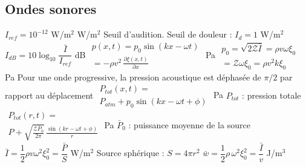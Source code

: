 \subsection{Ondes sonores}
\begin{formules}
    {$I_{ref} = 10^{-12}$ W/m$^2$}
    {W/m$^2$}
    {Seuil d'audition. Seuil de douleur : $I_d = 1$ W/m$^2$}
    {$I_{dB} = 10\log_{10}\dfrac{\bar I}{I_{ref}}$}
    {dB}
    {}
    {$\begin{gathered}
      p(x,t) = p_0\sin(kx - \omega t) \\
      = -\rho v^2\,\frac{\partial\xi(x,t)}{\partial x}
     \end{gathered}$}
    {Pa}
    {}
    {$\begin{gathered}
      p_0 = \sqrt{2\mathcal{Z}\bar I} = \rho v\omega\xi_0 \\
      = \mathcal{Z}\omega\xi_0 = \rho v^2k\xi_0
     \end{gathered}$}
    {Pa}
    {Pour une onde progressive, la pression acoustique est déphasée de $\pi/2$ par rapport au déplacement}
    {$\begin{gathered}
      P_{tot}(x,t) = \\
      P_{atm} + p_0\sin(kx - \omega t + \phi)
     \end{gathered}$}
    {Pa}
    {$P_{tot}$ : pression totale}
    {$\begin{gathered}
      P_{tot}(r,t) = \\
      P + \sqrt{\frac{\mathcal{Z}\bar P_0}{2\pi}}\,\frac{\sin(kr - \omega t + \phi)}{r}
     \end{gathered}$}
    {Pa}
    {$\bar P_0$ : puissance moyenne de la source}
    {$\bar I = \dfrac{1}{2}\rho v\omega^2\xi_0^2 = \dfrac{\bar P}{S}$}
    {W/m$^2$}
    {Source sphérique : $S = 4\pi r^2$}
    {$\bar w = \dfrac{1}{2}\rho\,\omega^2\xi_0^2 = \dfrac{\bar I}{v}$}
    {J/m$^3$}
    {}
\end{formules}

